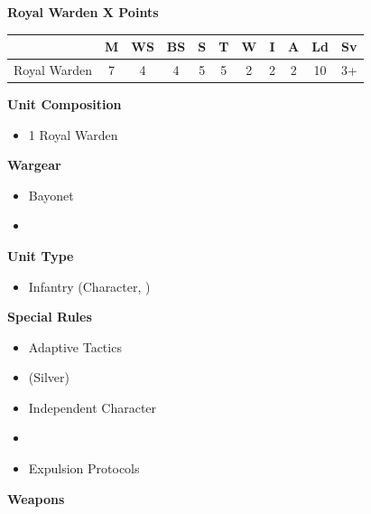 \subsubsection[Royal Warden]{}
\begin{minipage}[t]{0.72\textwidth}
	{\large \textbf{Royal Warden \dotfill X Points}}
	
	\begin{tabular}{m{160 pt} *{10}{c}}
		& M & WS & BS & S & T & W & I & A & Ld & Sv \\
		\hline
		Royal Warden & 7 & 4 & 4 & 5 & 5 & 2 & 2 & 2 & 10 & 3+ \\
	\end{tabular}
	\small
	\begin{minipage}[t]{0.5\textwidth}
		\begin{flushleft}
		\vspace*{2em}
		\textbf{Unit Composition}
		\begin{itemize}
			\item 1 Royal Warden
		\end{itemize}
		
		\textbf{Wargear}
		\begin{itemize}
			\item Bayonet
			\item {}
		\end{itemize}
		\end{flushleft}
	\end{minipage}
	\begin{minipage}{0.5\textwidth}
		\vspace*{2em}
		\textbf{Unit Type}
		\begin{itemize}
			\item Infantry (Character, )
		\end{itemize}
		
		\textbf{Special Rules}
		\begin{itemize}
			\item Adaptive Tactics
			\item {} (Silver)
			\item Independent Character
			\item {}
			\item Expulsion Protocols
		\end{itemize}
	\end{minipage}
	
	\vspace*{2em}
	\textbf{Weapons}
	

\end{minipage}

